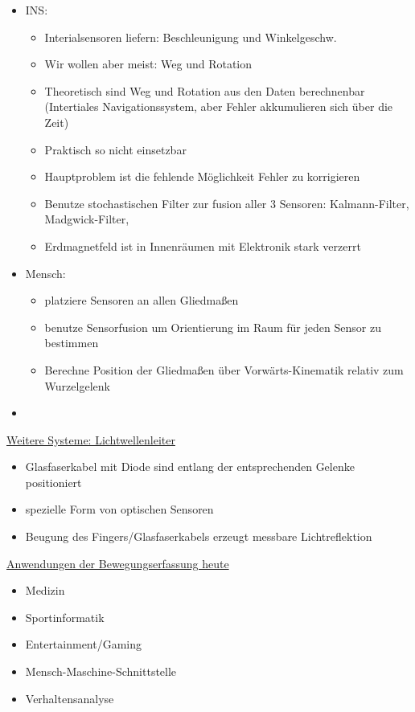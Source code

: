 \documentclass[a4paper,10pt,oneside]{article}
\begin{document}
\begin{itemize}
		\item INS:
			\begin{itemize}
				\item Interialsensoren liefern: Beschleunigung und Winkelgeschw.
				\item Wir wollen aber meist: Weg und Rotation
				\item Theoretisch sind Weg und Rotation aus den Daten berechnenbar (Intertiales Navigationssystem, aber Fehler akkumulieren sich über die Zeit)
				\item Praktisch so nicht einsetzbar
				\item Hauptproblem ist die fehlende Möglichkeit Fehler zu korrigieren
				\item Benutze stochastischen Filter zur fusion aller 3 Sensoren: Kalmann-Filter, Madgwick-Filter, 
				\item Erdmagnetfeld ist in Innenräumen mit Elektronik stark verzerrt
			\end{itemize}
		\item Mensch:
			\begin{itemize}
				\item platziere Sensoren an allen Gliedmaßen
				\item benutze Sensorfusion um Orientierung im Raum für jeden Sensor zu bestimmen
				\item Berechne Position der Gliedmaßen über Vorwärts-Kinematik relativ zum Wurzelgelenk
			\end{itemize}
		\item[] %
	\end{itemize}

\underline{Weitere Systeme: Lichtwellenleiter} \\
	\begin{itemize}
		\item Glasfaserkabel mit Diode sind entlang der entsprechenden Gelenke positioniert
		\item spezielle Form von optischen Sensoren
		\item Beugung des Fingers/Glasfaserkabels erzeugt messbare Lichtreflektion
	\end{itemize}

\underline{Anwendungen der Bewegungserfassung heute} \\
	\begin{itemize}
		\item Medizin
		\item Sportinformatik
		\item Entertainment/Gaming
		\item Mensch-Maschine-Schnittstelle
		\item Verhaltensanalyse
	\end{itemize}
	
\end{document}
